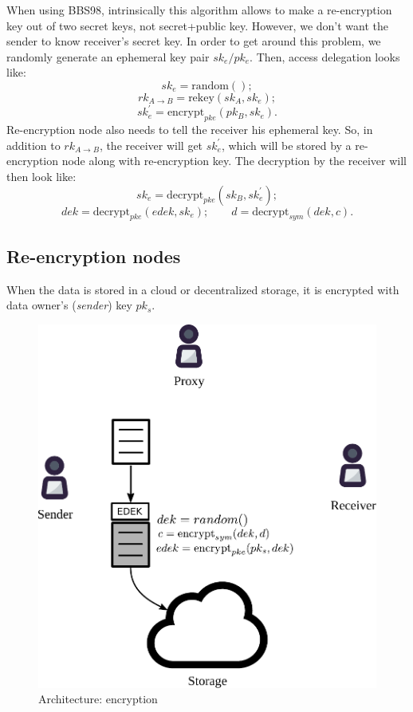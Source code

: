 \documentclass[notitlepage,longbibliography]{revtex4-1}
\begin{document}
When using BBS98, intrinsically this algorithm allows to make a re-encryption key out of two secret keys, not secret+public key.
However, we don't want the sender to know receiver's secret key.
In order to get around this problem, we randomly generate an ephemeral key pair $sk_e/pk_e$.
Then, access delegation looks like:
$$sk_e = \text{random}();$$
$$rk_{A\rightarrow B} = \text{rekey}(sk_A, sk_e);$$
$$sk_e^{\prime} = \text{encrypt}_{pke}(pk_B, sk_e).$$
Re-encryption node also needs to tell the receiver his ephemeral key.
So, in addition to $rk_{A\rightarrow B}$, the receiver will get $sk_e^{\prime}$, which will be stored by a re-encryption node along with re-encryption key.
The decryption by the receiver will then look like:
$$sk_e = \text{decrypt}_{pke}(sk_B, sk_e^{\prime});$$
$$dek=\text{decrypt}_{pke}(edek, sk_e);\qquad d = \text{decrypt}_{sym}(dek, c).$$

\subsection{Re-encryption nodes}

When the data is stored in a cloud or decentralized storage, it is encrypted with data owner's (\emph{sender}) key $pk_s$.
\begin{figure}
\centering
    \includegraphics[width=0.4\columnwidth]{pdf/encrypt.pdf}
    \caption{Architecture: encryption}
    \label{fig:pre}
\end{figure}
\end{document}
